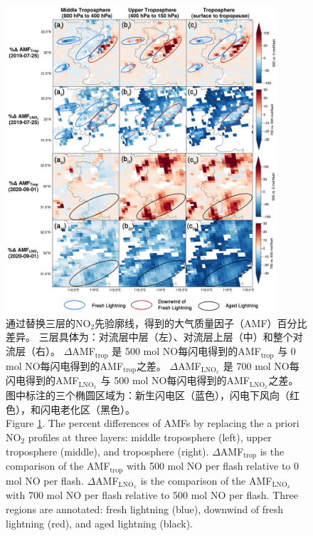 \begin{figure}[H]
    \centering
    \includegraphics[width=0.9\textwidth]{./figures/china_s5p_amf_diff.png}
    \caption{
    通过替换三层的NO$_2$先验廓线，得到的大气质量因子（AMF）百分比差异。
    三层具体为：对流层中层（左）、对流层上层（中）和整个对流层（右）。
     $\Delta$AMF$_\textrm{trop}$ 是 500 mol NO每闪电得到的AMF$_\textrm{trop}$ 与 0 mol NO每闪电得到的AMF$_\textrm{trop}$之差。
     $\Delta$AMF$_\textrm{LNO$_x$}$ 是 700 mol NO每闪电得到的AMF$_\textrm{LNO$_x$}$ 与 500 mol NO每闪电得到的AMF$_\textrm{LNO$_x$}$之差。
     图中标注的三个椭圆区域为：新生闪电区（蓝色），闪电下风向（红色），和闪电老化区（黑色）。\\
    Figure \ref{fig:china_s5p_amf_diff}. The percent differences of AMFs by replacing the a priori NO$_2$ profiles at three layers:
    middle troposphere (left), upper troposphere (middle), and troposphere (right).
    $\Delta$AMF$_\textrm{trop}$ is the comparison of the AMF$_\textrm{trop}$ with 500 mol NO per flash relative to 0 mol NO per flash.
    $\Delta$AMF$_\textrm{LNO$_x$}$ is the comparison of the AMF$_\textrm{LNO$_x$}$ with 700 mol NO per flash relative to 500 mol NO per flash.
    Three regions are annotated: fresh lightning (blue),
    downwind of fresh lightning (red),
    and aged lightning (black).
    }
    \label{fig:china_s5p_amf_diff}
\end{figure}


